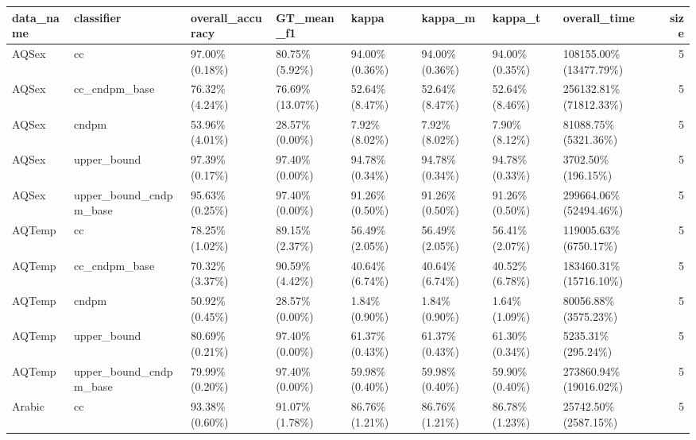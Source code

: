 \begin{tabular}{llllllllr}
\toprule
       data\_name &             classifier & overall\_accuracy &      GT\_mean\_f1 &           kappa &         kappa\_m &         kappa\_t &             overall\_time &  size \\
\midrule
           AQSex &                     cc &   97.00\% (0.18\%) &  80.75\% (5.92\%) &  94.00\% (0.36\%) &  94.00\% (0.36\%) &  94.00\% (0.35\%) &   108155.00\% (13477.79\%) &     5 \\
           AQSex &          cc\_cndpm\_base &   76.32\% (4.24\%) & 76.69\% (13.07\%) &  52.64\% (8.47\%) &  52.64\% (8.47\%) &  52.64\% (8.46\%) &   256132.81\% (71812.33\%) &     5 \\
           AQSex &                  cndpm &   53.96\% (4.01\%) &  28.57\% (0.00\%) &   7.92\% (8.02\%) &   7.92\% (8.02\%) &   7.90\% (8.12\%) &     81088.75\% (5321.36\%) &     5 \\
           AQSex &            upper\_bound &   97.39\% (0.17\%) &  97.40\% (0.00\%) &  94.78\% (0.34\%) &  94.78\% (0.34\%) &  94.78\% (0.33\%) &       3702.50\% (196.15\%) &     5 \\
           AQSex & upper\_bound\_cndpm\_base &   95.63\% (0.25\%) &  97.40\% (0.00\%) &  91.26\% (0.50\%) &  91.26\% (0.50\%) &  91.26\% (0.50\%) &   299664.06\% (52494.46\%) &     5 \\
          AQTemp &                     cc &   78.25\% (1.02\%) &  89.15\% (2.37\%) &  56.49\% (2.05\%) &  56.49\% (2.05\%) &  56.41\% (2.07\%) &    119005.63\% (6750.17\%) &     5 \\
          AQTemp &          cc\_cndpm\_base &   70.32\% (3.37\%) &  90.59\% (4.42\%) &  40.64\% (6.74\%) &  40.64\% (6.74\%) &  40.52\% (6.78\%) &   183460.31\% (15716.10\%) &     5 \\
          AQTemp &                  cndpm &   50.92\% (0.45\%) &  28.57\% (0.00\%) &   1.84\% (0.90\%) &   1.84\% (0.90\%) &   1.64\% (1.09\%) &     80056.88\% (3575.23\%) &     5 \\
          AQTemp &            upper\_bound &   80.69\% (0.21\%) &  97.40\% (0.00\%) &  61.37\% (0.43\%) &  61.37\% (0.43\%) &  61.30\% (0.34\%) &       5235.31\% (295.24\%) &     5 \\
          AQTemp & upper\_bound\_cndpm\_base &   79.99\% (0.20\%) &  97.40\% (0.00\%) &  59.98\% (0.40\%) &  59.98\% (0.40\%) &  59.90\% (0.40\%) &   273860.94\% (19016.02\%) &     5 \\
          Arabic &                     cc &   93.38\% (0.60\%) &  91.07\% (1.78\%) &  86.76\% (1.21\%) &  86.76\% (1.21\%) &  86.78\% (1.23\%) &     25742.50\% (2587.15\%) &     5 \\

\end{tabular}
